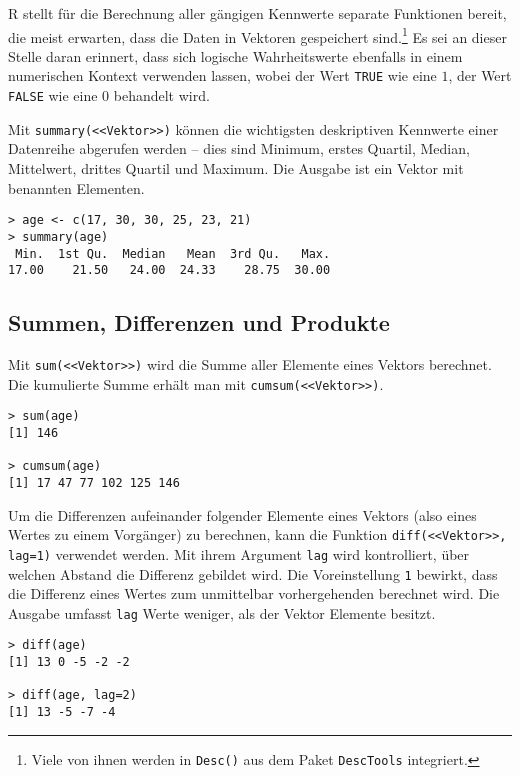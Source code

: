 R stellt für die Berechnung aller gängigen Kennwerte separate Funktionen bereit, die meist erwarten, dass die Daten in Vektoren gespeichert sind.\footnote{Viele von ihnen werden in  \lstinline!Desc()! aus dem Paket \lstinline!DescTools! integriert.} Es sei an dieser Stelle daran erinnert, dass sich logische Wahrheitswerte ebenfalls in einem numerischen Kontext verwenden lassen, wobei der Wert \lstinline!TRUE! wie eine $1$, der Wert \lstinline!FALSE! wie eine $0$ behandelt wird.

Mit \lstinline!summary(<<Vektor>>)! können die wichtigsten deskriptiven Kennwerte einer Datenreihe abgerufen werden -- dies sind Minimum, erstes Quartil, Median, Mittelwert, drittes Quartil und Maximum. Die Ausgabe ist ein Vektor mit benannten Elementen.
\begin{lstlisting}
> age <- c(17, 30, 30, 25, 23, 21)
> summary(age)
 Min.  1st Qu.  Median   Mean  3rd Qu.   Max.
17.00    21.50   24.00  24.33    28.75  30.00
\end{lstlisting}

\subsection{Summen, Differenzen und Produkte}
\label{sec:sum}

Mit \lstinline!sum(<<Vektor>>)! wird die Summe aller Elemente eines Vektors berechnet. Die kumulierte Summe erhält man mit \lstinline!cumsum(<<Vektor>>)!.
\begin{lstlisting}
> sum(age)
[1] 146

> cumsum(age)
[1] 17 47 77 102 125 146
\end{lstlisting}

Um die Differenzen aufeinander folgender Elemente eines Vektors (also eines Wertes zu einem Vorgänger) zu berechnen, kann die Funktion \lstinline!diff(<<Vektor>>, lag=1)! verwendet werden. Mit ihrem Argument \lstinline!lag! wird kontrolliert, über welchen Abstand die Differenz gebildet wird. Die Voreinstellung \lstinline!1! bewirkt, dass die Differenz eines Wertes zum unmittelbar vorhergehenden berechnet wird. Die Ausgabe umfasst \lstinline!lag! Werte weniger, als der Vektor Elemente besitzt.
\begin{lstlisting}
> diff(age)
[1] 13 0 -5 -2 -2

> diff(age, lag=2)
[1] 13 -5 -7 -4
\end{lstlisting}

